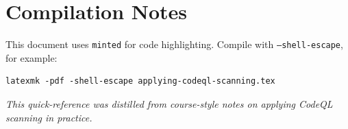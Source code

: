 \documentclass[11pt,a4paper]{article}
\begin{document}
\section*{Compilation Notes}
This document uses \texttt{minted} for code highlighting. Compile with \texttt{--shell-escape}, for example:
\begin{verbatim}
latexmk -pdf -shell-escape applying-codeql-scanning.tex
\end{verbatim}

\vfill
\noindent\textit{This quick-reference was distilled from course-style notes on applying CodeQL scanning in practice.}
\end{document}
